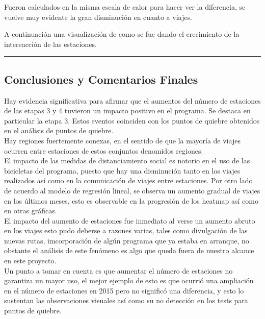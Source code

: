 \documentclass[
]{article}
\begin{document}
Fueron calculados en la misma escala de calor para hacer ver la
diferencia, se vuelve muy evidente la gran disminución en cuanto a
viajes.

A continuación una visualización de como se fue dando el crecimiento de
la intereacción de las estaciones.


\begin{center}\rule{0.5\linewidth}{0.5pt}\end{center}


\newpage

\hypertarget{conclusiones-y-comentarios-finales}{%
\subsection{Conclusiones y Comentarios
Finales}\label{conclusiones-y-comentarios-finales}}

  Hay evidencia significativa para afirmar que el aumentos del número de
  estaciones de las etapas 3 y 4 tuvieron un impacto positivo en el
  programa. Se destaca en particular la etapa 3. Estos eventos coinciden con los puntos de quiebre obtenidos en el análisis de puntos de quiebre.\\

  Hay regiones fuertemente conexas, en el sentido de que la mayoría de
  viajes ocurren entre estaciones de estos conjuntos denomidos regiones.\\

  El impacto de las medidas de distanciamiento social es notorio en el
  uso de las bicicletas del programa, puesto que hay una disminución tanto en los viajes realizados así como en la comunicación de viajes entre estaciones. Por otro lado de acuerdo al modelo de regresión lineal, se observa un aumento gradual de viajes en los últimos meses, esto es observable en la progresión de los heatmap así como en otras gráficas.\\

  El impacto del aumento de estaciones fue inmediato al verse un aumento
  abruto en los viajes esto pudo deberse a razones varias, tales como divulgación de las nuevas rutas, imcorporación de algún programa que ya estaba en arranque, no obstante el análisis de este fenómeno es algo que queda fuera de nuestro alcance en este proyecto.\\

  Un punto a tomar en cuenta es que aumentar el número de estaciones no
  garantiza un mayor uso, el mejor ejemplo de esto es que ocurrió una ampliación en el número de estaciones en 2015 pero no
  significó una diferencia, y esto lo sustentan las observaciones
  visuales así como su no detección en los tests para puntos de quiebre.
\end{document}
